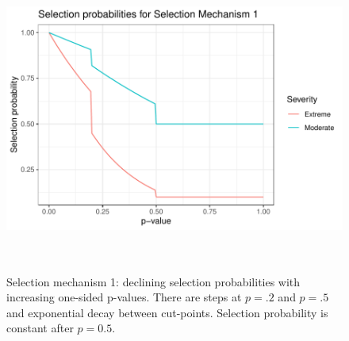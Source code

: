 \documentclass[12pt]{article}   	%
\numberwithin{equation}{section}
\begin{document}
\begin{figure}
\includegraphics[height = 4in, width = 6in]{SM1.pdf}
\caption{Selection mechanism 1: declining selection probabilities with increasing one-sided p-values. There are steps at $p = .2$ and $p=.5$ and exponential decay between cut-points. 
Selection probability is constant after $p=0.5$.}
\label{fig:SM1}
\end{figure}



\end{document}
